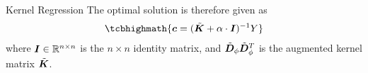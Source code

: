 \begin{frame}{Kernel Regression}
%
The optimal solution is therefore given as
\begin{align}
    \tcbhighmath{
    \bc = (\abK + \alpha \cdot \bI)^{-1} Y}
    \label{eq:reg:linear:kernel_c}
\end{align}
where ${\boldsymbol I} \in {\mathord{\mathbb R}}^{n\times n}$ is the $n \times n$ identity matrix,
and $\tilde{{\boldsymbol D}}_\phi \tilde{{\boldsymbol D}}_\phi^T$ is the augmented kernel matrix $\tilde{{\boldsymbol K}}$.%
%
\end{frame}


